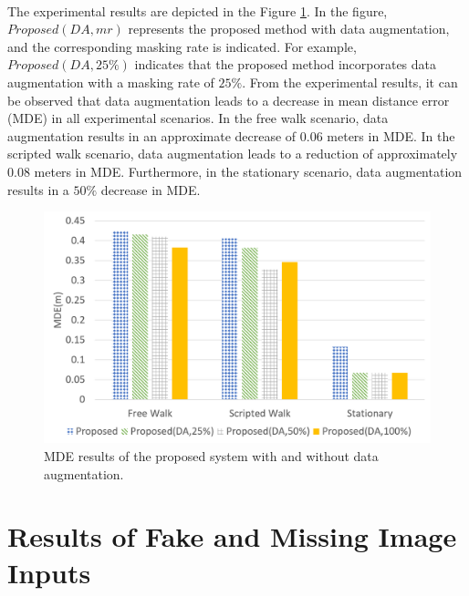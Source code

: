 \documentclass[a4paper,12pt]{report}
\begin{document}
\paragraph{}
The experimental results are depicted in the Figure \ref{Fig:mde_da}. In the figure, $Proposed(DA, mr)$ represents the proposed method with data augmentation, and the corresponding masking rate is indicated. For example, $Proposed (DA, 25\%)$ indicates that the proposed method incorporates data augmentation with a masking rate of $25\%$. From the experimental results, it can be observed that data augmentation leads to a decrease in mean distance error (MDE) in all experimental scenarios. In the free walk scenario, data augmentation results in an approximate decrease of 0.06 meters in MDE. In the scripted walk scenario, data augmentation leads to a reduction of approximately 0.08 meters in MDE. Furthermore, in the stationary scenario, data augmentation results in a $50\%$ decrease in MDE.
\begin{figure}[h]
    \centering
    \includegraphics[width=0.8\columnwidth]{images/chap5-4/MDE_DA.png}
    \caption{MDE results of the proposed system with and without data augmentation.}
    \label{Fig:mde_da}
\end{figure}
\section{Results of Fake and Missing Image Inputs}
\end{document}
